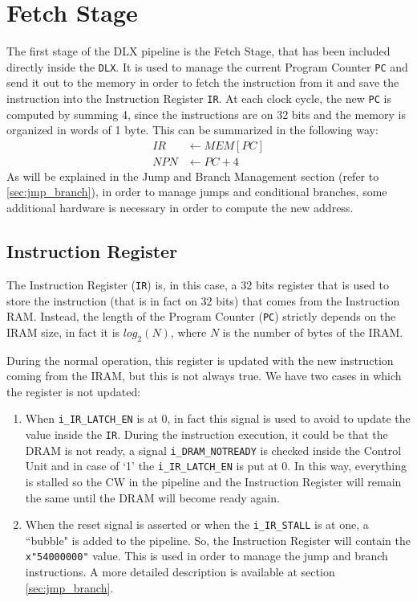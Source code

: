 \chapter{Fetch Stage}
The first stage of the DLX pipeline is the Fetch Stage, that has been included directly inside the \texttt{DLX}. It is used to manage the current Program Counter \texttt{PC} and send it out to the memory in order to fetch the instruction from it and save the instruction into the Instruction Register \texttt{IR}. At each clock cycle, the new \texttt{PC} is computed by summing 4, since the instructions are on 32 bits and the memory is organized in words of 1 byte. This can be summarized in the following way:
\begin{align*}
	IR &\leftarrow MEM[PC]\\
	NPN &\leftarrow PC + 4
\end{align*}
As will be explained in the Jump and Branch Management section (refer to \ref{sec:jmp_branch}), in order to manage jumps and conditional branches, some additional hardware is necessary in order to compute the new address.

\section{Instruction Register}
The Instruction Register (\texttt{IR}) is, in this case, a 32 bits register that is used to store the instruction (that is in fact on 32 bits) that comes from the Instruction RAM. Instead, the length of the Program Counter (\texttt{PC}) strictly depends on the IRAM size, in fact it is $log_2(N)$, where $N$ is the number of bytes of the IRAM.

During the normal operation, this register is updated with the new instruction coming from the IRAM, but this is not always true. We have two cases in which the register is not updated:
\begin{enumerate}
	\item When \texttt{i\_IR\_LATCH\_EN} is at 0, in fact this signal is used to avoid to update the value inside the \texttt{IR}. During the instruction execution, it could be that the DRAM is not ready, a signal \texttt{i\_DRAM\_NOTREADY} is checked inside the Control Unit and in case of `1' the \texttt{i\_IR\_LATCH\_EN} is put at 0. In this way, everything is stalled so the CW in the pipeline and the Instruction Register will remain the same until the DRAM will become ready again. 
	\item When the reset signal is asserted or when the \texttt{i\_IR\_STALL} is at one, a ``bubble" is added to the pipeline. So, the Instruction Register will contain the \texttt{x"54000000"} value. This is used in order to manage the jump and branch instructions. A more detailed description is available at section \ref{sec:jmp_branch}.
\end{enumerate}

